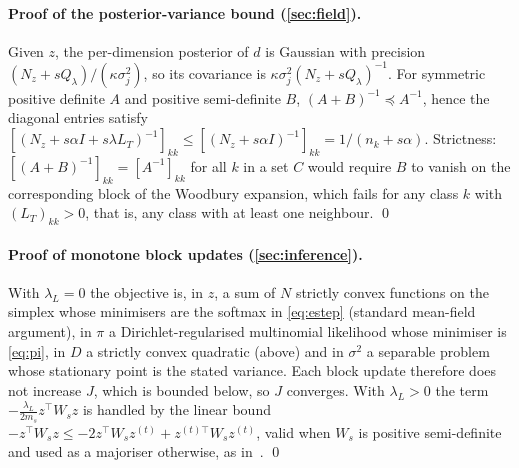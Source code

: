 \paragraph{Proof of the posterior-variance bound (\cref{sec:field}).}
Given $z$, the per-dimension posterior of $d$ is Gaussian with precision $(N_z + sQ_\lambda)/(\kappa\sigma_j^2)$, so its covariance is $\kappa\sigma_j^2(N_z + sQ_\lambda)^{-1}$. For symmetric positive definite $A$ and positive semi-definite $B$, $(A+B)^{-1}\preceq A^{-1}$, hence the diagonal entries satisfy $[(N_z + s\alpha I + s\lambda L_T)^{-1}]_{kk}\le [(N_z + s\alpha I)^{-1}]_{kk} = 1/(n_k + s\alpha)$. Strictness: $[(A+B)^{-1}]_{kk} = [A^{-1}]_{kk}$ for all $k$ in a set $C$ would require $B$ to vanish on the corresponding block of the Woodbury expansion, which fails for any class $k$ with $(L_T)_{kk}>0$, that is, any class with at least one neighbour. \qed

\paragraph{Proof of monotone block updates (\cref{sec:inference}).}
With $\lambda_L = 0$ the objective is, in $z$, a sum of $N$ strictly convex functions on the simplex whose minimisers are the softmax in \cref{eq:estep} (standard mean-field argument), in $\pi$ a Dirichlet-regularised multinomial likelihood whose minimiser is \cref{eq:pi}, in $D$ a strictly convex quadratic (above) and in $\sigma^2$ a separable problem whose stationary point is the stated variance. Each block update therefore does not increase $J$, which is bounded below, so $J$ converges. With $\lambda_L>0$ the term $-\frac{\lambda_L}{2m_s}z^{\top}W_s z$ is handled by the linear bound $-z^{\top}W_s z\le -2 z^{\top}W_s z^{(t)} + z^{(t)\top}W_s z^{(t)}$, valid when $W_s$ is positive semi-definite and used as a majoriser otherwise, as in~\cite{ziko2020laplacianshot,zanella2024transclip}. \qed

